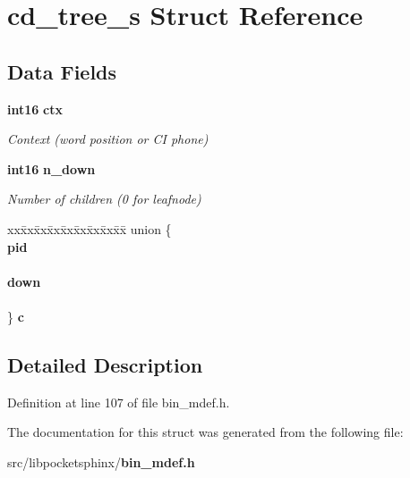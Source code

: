 \section{cd\-\_\-tree\-\_\-s \-Struct \-Reference}
\label{structcd__tree__s}
\subsection*{\-Data \-Fields}
\begin{DoxyCompactItemize}
\item 
{\bf int16} {\bf ctx}\label{structcd__tree__s_a2168538bf6cc21ad1a2c99fa2deb4559}

\begin{DoxyCompactList}\small\item\em \-Context (word position or \-C\-I phone) \end{DoxyCompactList}\item 
{\bf int16} {\bf n\-\_\-down}\label{structcd__tree__s_ae5e735d325b0f278ff2ad55293faa616}

\begin{DoxyCompactList}\small\item\em \-Number of children (0 for leafnode) \end{DoxyCompactList}\item 
\begin{tabbing}
xx\=xx\=xx\=xx\=xx\=xx\=xx\=xx\=xx\=\kill
union \{\\
 {\bf pid}\\
\>\\
 {\bf down}\\
\>\\
\} {\bfseries c}\label{structcd__tree__s_acc49ddc3248fc58d5a9bf241fffcbc2b}
\\

\end{tabbing}\end{DoxyCompactItemize}


\subsection{\-Detailed \-Description}


\-Definition at line 107 of file bin\-\_\-mdef.\-h.



\-The documentation for this struct was generated from the following file\-:\begin{DoxyCompactItemize}
\item 
src/libpocketsphinx/{\bf bin\-\_\-mdef.\-h}\end{DoxyCompactItemize}

